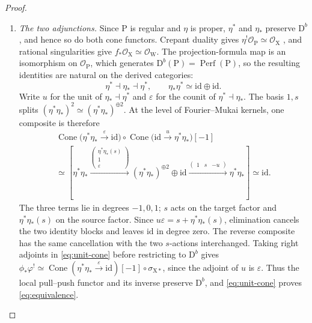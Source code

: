 \documentclass[a4paper,10pt]{article}
\newcommand{\X}{\mathrm{X}}
\newcommand{\W}{\mathrm{W}}
\newcommand{\Pj}{\mathrm{P}}
\newcommand{\OO}{\mathcal O}
\newcommand{\Db}{\mathrm{D}^b}
\newcommand{\id}{\mathrm{id}}
\newcommand{\Cone}{\operatorname{Cone}}
\theoremstyle{remark}
\theoremstyle{plain}
\begin{document}
\begin{proof}
\begin{enumerate}
\item \emph{The two adjunctions.}
Since $\Pj$ is regular and $\eta$ is proper, $\eta^*$ and $\eta_*$
preserve $\Db$, and hence so do both cone functors.
Crepant duality gives $\eta^!\OO_\Pj\simeq\OO_\X$
\cite[\href{https://stacks.math.columbia.edu/tag/0B6U}{Tag~0B6U}]{Stacks},
and rational singularities give $f_*\OO_\X\simeq\OO_\W$.
The projection-formula map is an isomorphism on $\OO_\Pj$, which
generates $\Db(\Pj)=\operatorname{Perf}(\Pj)$, so the resulting
identities are natural on the derived categories:
\[
\eta^*\dashv \eta_*\dashv \eta^*,
\qquad \eta_*\eta^*\simeq\id\oplus\id.
\]
Write $u$ for the unit of $\eta_*\dashv\eta^*$ and $\varepsilon$ for
the counit of $\eta^*\dashv\eta_*$. The basis $1,s$ splits
$(\eta^*\eta_*)^2\simeq(\eta^*\eta_*)^{\oplus2}$. At the level of
Fourier--Mukai kernels, one composite is therefore
\[
\begin{gathered}
\Cone\bigl(\eta^*\eta_*\xrightarrow{\varepsilon}\id\bigr)
\circ\Cone\bigl(\id\xrightarrow{u}\eta^*\eta_*\bigr)[-1]
\\
\simeq\left[
\eta^*\eta_*
\xrightarrow{\left(\begin{smallmatrix}\eta^*\eta_*(s)\\1\\\varepsilon\end{smallmatrix}\right)}
(\eta^*\eta_*)^{\oplus2}\oplus\id
\xrightarrow{\left(\begin{smallmatrix}1&s&-u\end{smallmatrix}\right)}
\eta^*\eta_*
\right]\simeq\id.
\end{gathered}
\]
The three terms lie in degrees $-1,0,1$; $s$ acts on the target factor
and $\eta^*\eta_*(s)$ on the source factor.
Since $u\varepsilon=s+\eta^*\eta_*(s)$, elimination cancels the two
identity blocks and leaves $\id$ in degree zero. The reverse composite
has the same cancellation with the two $s$-actions interchanged.
Taking right adjoints in \eqref{eq:unit-cone} before restricting to $\Db$ gives
$\phi_*\varphi^!\simeq
\Cone(\eta^*\eta_*\xrightarrow{\varepsilon}\id)[-1]\circ\sigma_{\X*}$,
since the adjoint of $u$ is $\varepsilon$.
Thus the local pull--push functor and its inverse preserve $\Db$,
and \eqref{eq:unit-cone} proves \eqref{eq:equivalence}.

\end{enumerate}
\end{proof}
\end{document}
